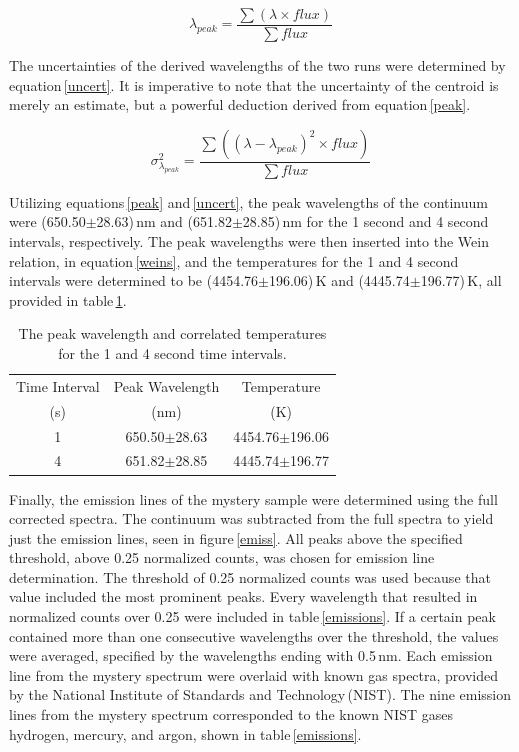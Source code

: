 \documentclass[twocolumn]{aastex6}
\begin{document}
\begin{equation}
\lambda_{peak} = \frac{\sum(\lambda\times flux)}{\sum flux}
\label{peak}
\end{equation}

The uncertainties of the derived wavelengths of the two runs were determined by equation\,\ref{uncert}. It is imperative to note that the uncertainty of the centroid is merely an estimate, but a powerful deduction derived from equation\,\ref{peak}.

\begin{equation}
\sigma_{\lambda_{peak}}^2 = \frac{\sum((\lambda - \lambda_{peak})^2 \times flux)}{\sum flux}
\label{uncert}
\end{equation}

Utilizing equations\,\ref{peak} and\,\ref{uncert}, the peak wavelengths of the continuum were (650.50$\pm$28.63)\,nm and (651.82$\pm$28.85)\,nm for the 1 second and 4 second intervals, respectively. The peak wavelengths were then inserted into the Wein relation, in equation\,\ref{weins}, and the temperatures for the 1 and 4 second intervals were determined to be (4454.76$\pm$196.06)\,K and (4445.74$\pm$196.77)\,K, all provided in table\,\ref{wt}.


\begin{table}[h]
\begin{center}
\caption{The peak wavelength and correlated temperatures for the 1 and 4 second time intervals.}

\begin{tabular}{ c | c | c}
Time Interval & Peak Wavelength & Temperature \\
(s) & (nm) &  (K) \\ \hline \hline
1 & 650.50$\pm$28.63 & 4454.76$\pm$196.06 \\
4 & 651.82$\pm$28.85 & 4445.74$\pm$196.77 \\ 

\end{tabular}
\label{wt}
\end{center}
\end{table}

Finally, the emission lines of the mystery sample were determined using the full corrected spectra. The continuum was subtracted from the full spectra to yield just the emission lines, seen in figure\,\ref{emiss}. All peaks above the specified threshold, above 0.25 normalized counts, was chosen for emission line determination. The threshold of 0.25 normalized counts was used because that value included the most prominent peaks. Every wavelength that resulted in normalized counts over 0.25 were included in table\,\ref{emissions}. If a certain peak contained more than one consecutive wavelengths over the threshold, the values were averaged, specified by the wavelengths ending with 0.5\,nm. Each emission line from the mystery spectrum were overlaid with known gas spectra, provided by the National Institute of Standards and Technology\,(NIST). The nine emission lines from the mystery spectrum corresponded to the known NIST gases hydrogen, mercury, and argon, shown in table\,\ref{emissions}.
\end{document}
